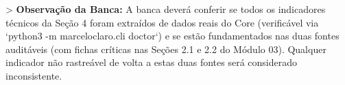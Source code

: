 




> \textbf{Observação da Banca:} A banca deverá conferir se todos os indicadores técnicos da Seção 4 foram extraídos de dados reais do Core (verificável via `python3 -m marceloclaro.cli doctor`) e se estão fundamentados nas duas fontes auditáveis (com fichas críticas nas Seções 2.1 e 2.2 do Módulo 03). Qualquer indicador não rastreável de volta a estas duas fontes será considerado inconsistente.